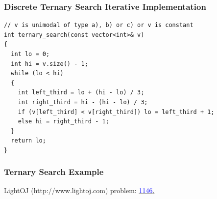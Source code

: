 \documentclass{beamer}
\newcommand{\lightojlink}[2]{LightOJ (http://www.lightoj.com)
  problem: \href{#2}{\textcolor{blue}{#1}.}}
\begin{document}
\begin{frame}[containsverbatim]
\frametitle{Discrete Ternary Search Iterative Implementation}
\scriptsize

\begin{lstlisting}[mathescape]
// v is unimodal of type a), b) or c) or v is constant
int ternary_search(const vector<int>& v)
{
  int lo = 0;
  int hi = v.size() - 1;
  while (lo < hi)
  {
    int left_third = lo + (hi - lo) / 3;
    int right_third = hi - (hi - lo) / 3;
    if (v[left_third] < v[right_third]) lo = left_third + 1;
    else hi = right_third - 1;
  }
  return lo;
}
\end{lstlisting}

\end{frame}

\begin{frame}%
\frametitle{Ternary Search Example}

\lightojlink{1146}{http://www.lightoj.com/volume_showproblem.php?problem=1146}

\end{frame}

\ifanswers
\end{document}
